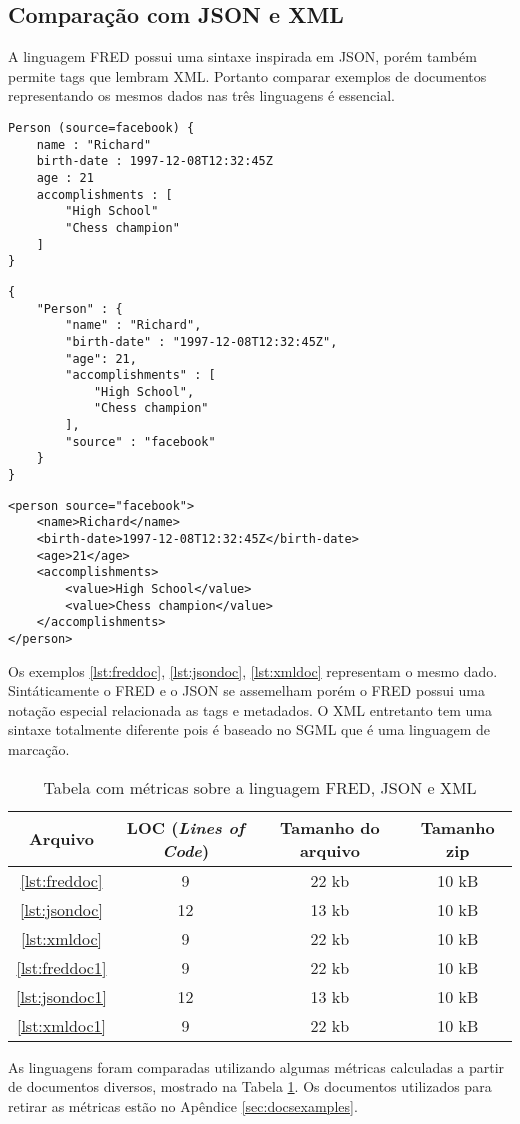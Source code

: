 \subsection{Comparação com JSON e XML}

A linguagem FRED possui uma sintaxe inspirada em JSON, porém também permite tags que lembram
XML. Portanto comparar exemplos de documentos representando os mesmos dados 
nas três linguagens é essencial.

\begin{lstlisting}[caption=Exemplo de documento FRED,label={lst:freddoc}]
Person (source=facebook) {
    name : "Richard"
    birth-date : 1997-12-08T12:32:45Z
    age : 21
    accomplishments : [
        "High School"
        "Chess champion"
    ]
}
\end{lstlisting}

\begin{lstlisting}[caption=Exemplo de documento JSON,label={lst:jsondoc}]
{ 
    "Person" : {
        "name" : "Richard",
        "birth-date" : "1997-12-08T12:32:45Z",
        "age": 21,
        "accomplishments" : [
            "High School",
            "Chess champion"
        ],
        "source" : "facebook"
    }
}
\end{lstlisting}

\begin{lstlisting}[caption=Exemplo de documento XML,label={lst:xmldoc}]
<person source="facebook">
    <name>Richard</name>
    <birth-date>1997-12-08T12:32:45Z</birth-date>
    <age>21</age>
    <accomplishments>
        <value>High School</value>
        <value>Chess champion</value>
    </accomplishments>
</person>
\end{lstlisting}

Os exemplos \ref{lst:freddoc}, \ref{lst:jsondoc}, \ref{lst:xmldoc} representam o mesmo dado.
Sintáticamente o FRED e o JSON se assemelham porém o FRED possui uma notação especial
relacionada as tags e metadados. O XML entretanto tem uma sintaxe totalmente diferente
pois é baseado no SGML que é uma linguagem de marcação.

\begin{table}[h]
    \centering
	\caption{Tabela com métricas sobre a linguagem FRED, JSON e XML}
	\label{tbl:metricslangs}

    \begin{tabular}{cccc}
		\toprule
		\textbf{Arquivo} & \textbf{LOC (\textit{Lines of Code})} & \textbf{Tamanho do arquivo} & 
		\textbf{Tamanho zip} \\
		\midrule
		\ref{lst:freddoc} & 9 & 22 kb & 10 kB\\
		\ref{lst:jsondoc} & 12 & 13 kb & 10 kB\\
        \ref{lst:xmldoc}  & 9 & 22 kb & 10 kB\\
        \ref{lst:freddoc1} & 9 & 22 kb & 10 kB\\
		\ref{lst:jsondoc1} & 12 & 13 kb & 10 kB\\
		\ref{lst:xmldoc1} & 9 & 22 kb & 10 kB\\
		\bottomrule
    \end{tabular}
\end{table}

As linguagens foram comparadas utilizando algumas métricas calculadas a partir de
documentos diversos, mostrado na Tabela \ref{tbl:metricslangs}. 
Os documentos utilizados para retirar as métricas estão no Apêndice \ref{sec:docsexamples}.
